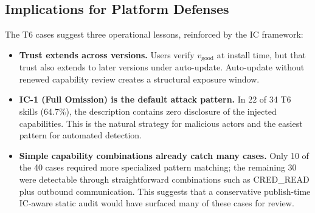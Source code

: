 \subsection{Implications for Platform Defenses}

The T6 cases suggest three operational lessons, reinforced by the IC framework:

\begin{itemize}
    \item \textbf{Trust extends across versions.} Users verify $v_{\text{good}}$ at install time, but that trust also extends to later versions under auto-update. Auto-update without renewed capability review creates a structural exposure window.
    \item \textbf{IC-1 (Full Omission) is the default attack pattern.} In 22 of 34 T6 skills (64.7\%), the description contains zero disclosure of the injected capabilities. This is the natural strategy for malicious actors and the easiest pattern for automated detection.
    \item \textbf{Simple capability combinations already catch many cases.} Only 10 of the 40 cases required more specialized pattern matching; the remaining 30 were detectable through straightforward combinations such as CRED\_READ plus outbound communication. This suggests that a conservative publish-time IC-aware static audit would have surfaced many of these cases for review.
\end{itemize}

